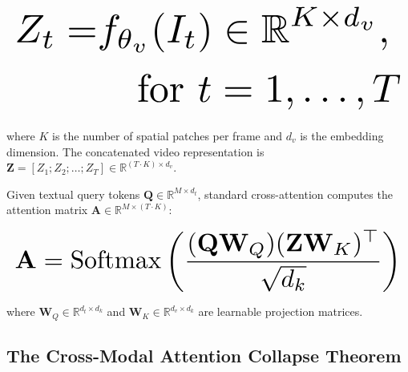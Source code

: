 \documentclass[manuscript,review]{acmart}
\begin{document}
\begin{equation}
\resizebox{\columnwidth}{!}{$\displaystyle
\begin{aligned}
Z_t = & f_{\theta_v}(I_t) \in \mathbb{R}^{K \times d_v}, \\
& \quad \text{for } t = 1, \ldots, T
\end{aligned}
$}
\end{equation}

















where $K$ is the number of spatial patches per frame and $d_v$ is the embedding dimension. The concatenated video representation is $\mathbf{Z} = [Z_1; Z_2; \ldots; Z_T] \in \mathbb{R}^{(T \cdot K) \times d_v}$.

Given textual query tokens $\mathbf{Q} \in \mathbb{R}^{M \times d_t}$, standard cross-attention computes the attention matrix $\mathbf{A} \in \mathbb{R}^{M \times (T \cdot K)}$:

















\begin{equation}
\resizebox{\columnwidth}{!}{$\displaystyle
\begin{aligned}
\mathbf{A} = \text{Softmax}\left( \frac{(\mathbf{Q} \mathbf{W}_Q) (\mathbf{Z} \mathbf{W}_K)^\top}{\sqrt{d_k}} \right)
\end{aligned}
$}
\end{equation}

















where $\mathbf{W}_Q \in \mathbb{R}^{d_t \times d_k}$ and $\mathbf{W}_K \in \mathbb{R}^{d_v \times d_k}$ are learnable projection matrices.




\subsection{The Cross-Modal Attention Collapse Theorem}
\end{document}
